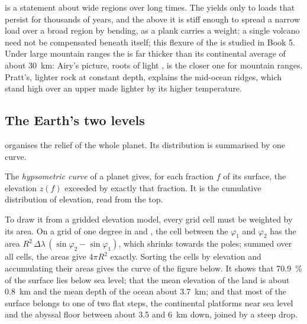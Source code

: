  is a statement about wide regions over long times. The 
yields only to loads that persist for thousands of years, and the 
above it is stiff enough to spread a narrow load over a broad region by bending,
as a plank carries a weight: a single volcano need not be compensated beneath
itself; this flexure of the  is studied in Book 5. Under large
mountain ranges the  is far thicker than its continental average of about
\qty{30}{km}: Airy's picture, roots of light , is the closer one for
mountain ranges. Pratt's, lighter rock at constant depth, explains the
mid-ocean ridges, which stand high over an upper  made lighter by its
higher temperature.

\subsection*{The Earth's two levels}

 organises the relief of the whole planet. Its distribution is
summarised by one curve.

\begin{definition}\label{def:b1:isostasy-gravity:hypsometry}
The \emph{hypsometric curve} of a planet gives, for
each fraction $f$ of its surface, the elevation $z(f)$ exceeded by exactly that
fraction. It is the cumulative distribution of elevation, read from the top.
\end{definition}

To draw it from a gridded elevation model, every grid cell must be weighted by
its area. On a grid of one degree in  and , the cell between
the  $\varphi_1$ and $\varphi_2$ has the area
$R^2\,\Delta\lambda\,(\sin\varphi_2 - \sin\varphi_1)$, which shrinks towards the
poles; summed over all cells, the areas give $4\pi R^2$ exactly. Sorting the
cells by elevation and accumulating their areas gives the curve of the figure
below. It shows that \qty{70.9}{\percent} of the surface lies below sea level;
that the mean elevation of the land is about \qty{0.8}{km} and the mean depth
of the ocean about \qty{3.7}{km}; and that most of the surface belongs to one of
two flat steps, the continental platforms near sea level and the abyssal
floor between about 3.5 and \qty{6}{km} down, joined by a steep drop.

